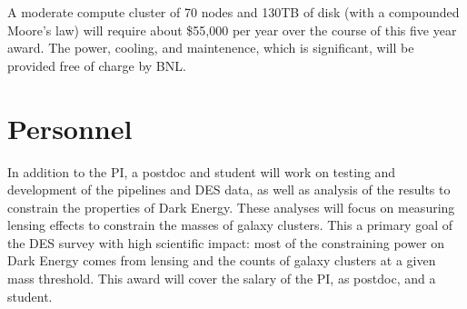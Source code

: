 \documentclass[12pt]{article}
\begin{document}
A moderate compute cluster of 70 nodes and 130TB of disk (with a compounded
Moore's law) will require about \$55,000 per year over the course of this
five year award.  The power, cooling, and maintenence, which is significant, will
be provided free of charge by BNL.

\section{Personnel}

In addition to the PI, a postdoc and student will work on testing and
development of the pipelines and DES data, as well as analysis of the results
to constrain the properties of Dark Energy.  These analyses will focus on
measuring lensing effects to constrain the masses of galaxy clusters.  This a
primary goal of the DES survey with high scientific impact:  most of the
constraining power on Dark Energy comes from lensing and the counts of galaxy
clusters at a given mass threshold.  This award will cover the salary of the
PI, as postdoc, and a student.
\end{document}
